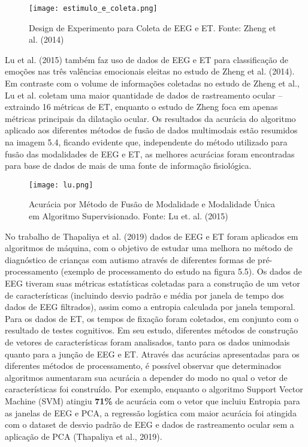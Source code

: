 \begin{figure}[!h]
      \centering
      \texttt{[image: estimulo\_e\_coleta.png]}
      \caption{Design de Experimento para Coleta de EEG e ET. Fonte: Zheng et al. (2014)}
\end{figure}

Lu et al. (2015) também faz uso de dados de EEG e ET para classificação de emoções nas três 
valências emocionais eleitas no estudo de Zheng et al. (2014). Em contraste com o volume de 
informações coletadas no estudo de Zheng et al., Lu et al. coletam uma maior quantidade de dados de rastreamento ocular – 
extraindo 16 métricas de ET, enquanto o estudo de Zheng foca em apenas métricas principais da dilatação ocular. 
Os resultados da acurácia do algoritmo aplicado aos diferentes métodos de fusão de dados multimodais estão resumidos na imagem 5.4, 
ficando evidente que, independente do método utilizado para fusão das modalidades de EEG e ET, 
as melhores acurácias foram encontradas para base de dados de mais de uma fonte de informação fisiológica. 

\begin{figure}
      \centering
      \texttt{[image: lu.png]}
      \caption{Acurácia por Método de Fusão de Modalidade e Modalidade Única em Algoritmo Supervisionado. Fonte: Lu et. al. (2015)}
\end{figure}

No trabalho de Thapaliya et al. (2019) dados de EEG e ET foram aplicados em algoritmos de máquina, 
com o objetivo de estudar uma melhora no método de diagnóstico de crianças com autismo através de 
diferentes formas de pré-processamento (exemplo de processamento do estudo na figura 5.5). 
Os dados de EEG tiveram suas métricas estatísticas coletadas para a construção de um vetor de características 
(incluindo desvio padrão e média por janela de tempo dos dados de EEG filtrados), assim como a entropia calculada 
por janela temporal. Para os dados de ET, os tempos de fixação foram coletados, em conjunto com o resultado de testes cognitivos. 
Em seu estudo, diferentes métodos de construção de vetores de características foram analisados, 
tanto para os dados unimodais quanto para a junção de EEG e ET. 
Através das acurácias apresentadas para os diferentes métodos de processamento, 
é possível observar que determinados algoritmos aumentaram sua acurácia a
 depender do modo no qual o vetor de características foi construído. 
 Por exemplo, enquanto o algoritmo Support Vector Machine (SVM) atingiu \textbf{71\%} de acurácia 
 com o vetor que incluiu Entropia para as janelas de EEG e PCA, a regressão logística com maior acurácia 
 foi atingida com o dataset de desvio padrão de EEG e dados de rastreamento ocular sem a aplicação de PCA 
 (Thapaliya et al., 2019). 

